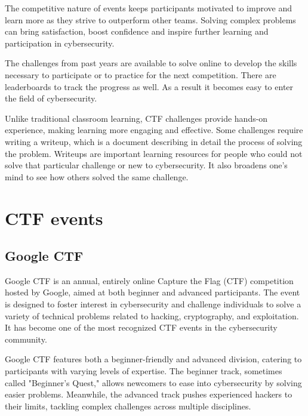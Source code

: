 \documentclass[conference]{IEEEtran}
\begin{document}
The competitive nature of events keeps participants motivated to
improve and learn more as they strive to outperform other teams. Solving
complex problems can bring satisfaction, boost confidence and inspire further
learning and participation in cybersecurity.

The challenges from past years are available to solve online to develop the
skills necessary to participate or to practice for the next competition. There are
leaderboards to track the progress as well. As a result it becomes easy to
enter the field of cybersecurity.

Unlike traditional classroom learning,
CTF challenges provide hands-on
experience, making learning more engaging and effective. Some challenges
require writing a writeup, which is a document describing in detail the process
of solving the problem. Writeups are important learning resources for people
who could not solve that particular challenge or new to cybersecurity. It also
broadens one's mind to see how others solved the same challenge.




\section{CTF events}
\label{sec-ctf-events}

\subsection{Google CTF}

Google CTF is an annual, entirely online Capture the Flag (CTF) competition hosted by Google,
aimed at both beginner and advanced participants. The event is designed to
foster interest in cybersecurity and challenge individuals to solve a variety
of technical problems related to hacking, cryptography, and exploitation. It
has become one of the most recognized CTF events in the cybersecurity
community.

Google CTF features both a beginner-friendly and advanced division, catering to
participants with varying levels of expertise. The beginner track, sometimes
called "Beginner's Quest," allows newcomers to ease into cybersecurity by
solving easier problems. Meanwhile, the advanced track pushes experienced
hackers to their limits, tackling complex challenges across multiple
disciplines.
\end{document}
